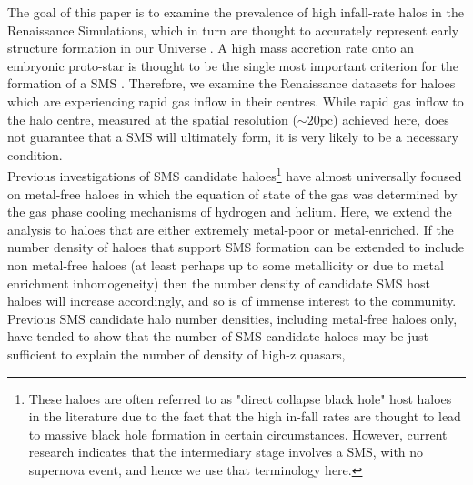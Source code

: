 \documentclass[graphics, twocolumn, usenatbib]{mn2e}
\begin{document}
The goal of this paper is to examine the prevalence of high infall-rate halos in the
Renaissance Simulations, which in turn are thought to accurately represent early structure formation in our Universe \citep{Chen_2014, Xu_2013, Xu_2014, OShea_2015,
  Barrow_2017, Wise_2019}. A high mass accretion rate onto an embryonic proto-star is thought to be the
single most important criterion for the formation of a SMS \citep{Hosokawa_2013, Sakurai_2016,
  Woods_2018}. Therefore, we examine the Renaissance datasets for haloes which are experiencing
rapid gas inflow in their centres. While rapid gas inflow to the halo centre, 
measured at the spatial resolution ($\sim 20$pc) achieved here, 
%
does not guarantee
that a SMS will ultimately form, it is very likely to be a necessary condition. \\
\indent Previous investigations of SMS candidate haloes\footnote{These haloes are often
  referred to as "direct collapse black hole" host haloes in the literature due to the fact
  that the high in-fall rates are thought to lead to massive black hole formation in certain
  circumstances. However, current research indicates that the intermediary stage involves a
  SMS, with no supernova event, and hence we use that terminology here.} have almost
universally focused on
metal-free haloes in which the equation of state of the gas was determined by the gas phase
cooling mechanisms of hydrogen and helium. Here, we extend the analysis to haloes that are either
extremely metal-poor or metal-enriched. If the number density of haloes that support SMS formation
can be extended to include non metal-free haloes (at least perhaps up to some
metallicity or due to metal enrichment inhomogeneity) then the
number density of candidate SMS host haloes will increase accordingly, and so is of
immense interest to the community. 
Previous SMS candidate halo number densities, including metal-free haloes only,
have tended to show that the number of SMS candidate haloes may be just sufficient to explain the number of density of high-z quasars,
\end{document}
